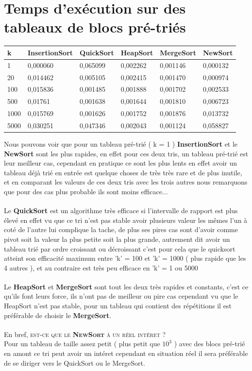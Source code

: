 \documentclass[a4paper, 11pt, oneside]{article}
\begin{document}
\section{Temps d'exécution sur des tableaux de blocs pré-triés}
\begin{table}[htb]
\begin{tabular}{llllll}
\hline
k    & InsertionSort & QuickSort & HeapSort & MergeSort & NewSort \\ \hline
1    & 0,000060              & 0,065099          & 0,002262         & 0,001146          & 0,000132        \\
20   & 0,014462              & 0,005105          & 0,002415         & 0,001470          & 0,000974        \\
100  & 0,015836              & 0,001485          & 0,001888      & 0,001702          & 0,002533        \\
500  & 0,01761              & 0,001638          & 0,001644         & 0,001810          & 0,006723        \\
1000 & 0,015769              & 0,001626          & 0,001752         & 0,001876          & 0,013732        \\
5000 & 0,030251              & 0,047346          & 0,002043         & 0,001124          & 0,058827       
\end{tabular}
\end{table}
Nous pouvons voir que pour un tableau pré-trié ( k = 1 ) \textbf{InsertionSort} et le \textbf{NewSort} sont les plus rapides, en effet pour ces deux tris, un tableau pré-trié est leur meilleur cas, cependant en pratique ce sont les plus lents en effet avoir un tableau déjà trié en entrée est quelque choses de très très rare et de plus inutile, et en comparant les valeurs de ces deux tris avec les trois autres nous remarquons que pour des cas plus probable ils sont moins efficace... \\ \\
Le \textbf{QuickSort} est un algorithme très efficace si l'intervalle de rapport est plus élevé en effet vu que ce tri n'est pas stable avoir plusieurs valeur les mêmes l'un à coté de l'autre lui complique la tache, de plus ses pires cas sont d'avoir comme pivot soit la valeur la plus petite soit la plus grande, autrement dit avoir un tableau trié par ordre croissant ou décroissant c'est pour cela que le quicksort atteint son efficacité maximum entre 'k' = 100 et 'k' = 1000 ( plus rapide que les 4 autres ), et au contraire est très peu efficace en 'k' = 1 ou 5000\\
\\
Le \textbf{HeapSort} et \textbf{MergeSort} sont tout les deux très rapides et constants, c'est ce qu'ils font leurs force, ils n'ont pas de meilleur ou pire cas cependant vu que le HeapSort n'est pas stable, pour un tableau qui contient des répétitions il est préférable de choisir le \textbf{MergeSort}.
\\ \\
En bref, \textsc{est-ce que le \textbf{NewSort} à un réel intéret ?} \\ Pour un tableau de taille assez petit ( plus petit que $10^{3}$ ) avec des blocs pré-trié en amont ce tri peut avoir un intéret cependant en situation réel il sera préférable de se diriger vers le QuickSort ou le MergeSort. 
 
\end{document}
